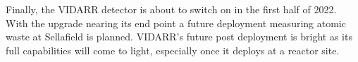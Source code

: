 \\\\Finally, the VIDARR detector is about to switch on in the first half of 2022. With the upgrade nearing its end point a future deployment measuring atomic waste at Sellafield is planned. VIDARR's future post deployment is bright as its full capabilities will come to light, especially once it deploys at a reactor site. 
